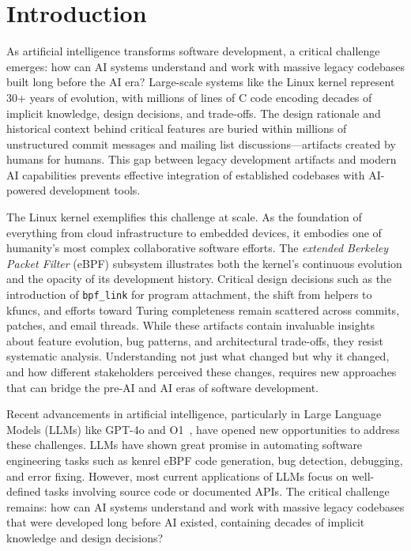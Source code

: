 \documentclass[sigconf,review,anonymous]{acmart}
\begin{document}
\maketitle

\section{Introduction}

As artificial intelligence transforms software development, a critical challenge emerges: how can AI systems understand and work with massive legacy codebases built long before the AI era? Large-scale systems like the Linux kernel represent 30+ years of evolution, with millions of lines of C code encoding decades of implicit knowledge, design decisions, and trade-offs. The design rationale and historical context behind critical features are buried within millions of unstructured commit messages and mailing list discussions—artifacts created by humans for humans. This gap between legacy development artifacts and modern AI capabilities prevents effective integration of established codebases with AI-powered development tools.

The Linux kernel exemplifies this challenge at scale. As the foundation of everything from cloud infrastructure to embedded devices, it embodies one of humanity's most complex collaborative software efforts. The \textit{extended Berkeley Packet Filter} (eBPF)\cite{ebpf} subsystem illustrates both the kernel's continuous evolution and the opacity of its development history. Critical design decisions such as the introduction of \texttt{bpf\_link}\cite{bpflink} for program attachment, the shift from helpers to kfuncs\cite{kfuncs}, and efforts toward Turing completeness remain scattered across commits, patches, and email threads. While these artifacts contain invaluable insights about feature evolution, bug patterns, and architectural trade-offs, they resist systematic analysis. Understanding not just what changed but why it changed, and how different stakeholders perceived these changes, requires new approaches that can bridge the pre-AI and AI eras of software development.

Recent advancements in artificial intelligence, particularly in Large Language Models (LLMs) like GPT-4o\cite{gpt4o} and O1~\cite{o1}, have opened new opportunities to address these challenges. LLMs have shown great promise in automating software engineering tasks such as kenrel eBPF code generation\cite{zheng2024kgent}, bug detection\cite{li2024enhancing}, debugging\cite{chen2023teaching}, and error fixing\cite{deligiannis2023fixing}. However, most current applications of LLMs focus on well-defined tasks involving source code or documented APIs. The critical challenge remains: how can AI systems understand and work with massive legacy codebases that were developed long before AI existed, containing decades of implicit knowledge and design decisions?
\end{document}

